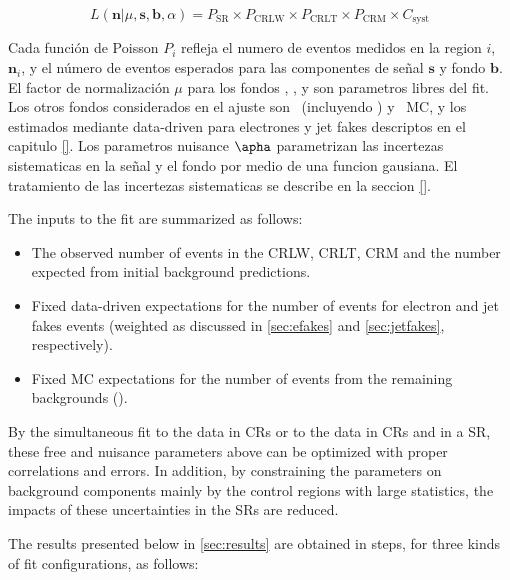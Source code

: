 \begin{equation} \label{eq:likelihood}
    L({\mathbf n}|\mu,{\mathbf s},{\mathbf b},\alpha) = P_\text{SR} \times P_\text{CRLW} \times P_\text{CRLT} \times P_\text{CRM} \times C_\text{syst}
\end{equation}

Cada función de Poisson $P_{i}$ refleja el numero de eventos medidos en la region $i$,
${\mathbf n_{i}}$, y el n\'umero de eventos esperados para las componentes de se\~nal
${\mathbf s}$ y fondo ${\mathbf b}$. El factor de normalización $\mu$ para los fondos
\wgamma, \ttbargam, y \gjet son parametros libres del fit.
Los otros fondos considerados en el ajuste son \vgamma\ (incluyendo \znunugam) y
\topgamma\ MC, y los estimados mediante data-driven para electrones y jet fakes
descriptos en el capitulo \ref{}.
Los parametros nuisance $\apha$ parametrizan las incertezas sistematicas en la se\~nal
y el fondo por medio de una funcion gausiana. El tratamiento de las incertezas
sistematicas se describe en la seccion \ref{}.


The inputs to the fit are summarized as follows:
\begin{itemize}
\item The observed number of events in the CRLW, CRLT, CRM and the number expected from initial background predictions.
\item Fixed data-driven expectations for the number of events for electron and jet fakes events (weighted as discussed in \Sec \ref{sec:efakes} and \ref{sec:jetfakes}, respectively).
\item Fixed MC expectations for the number of events from the remaining backgrounds (\zgam).
\end{itemize}

By the simultaneous fit to the data in CRs or to the data in CRs and in a SR, these free and nuisance
parameters above can  be optimized with proper correlations and errors. In addition, by constraining the
parameters on background components mainly by the control regions with large statistics, the impacts of
these uncertainties in the SRs are reduced.

The results presented below in \Sec \ref{sec:results} are obtained in steps, for three kinds of fit configurations, as follows:

